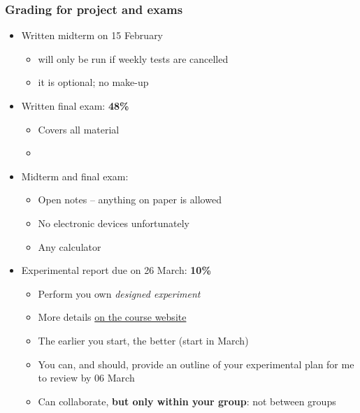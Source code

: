\begin{frame}\frametitle{Grading for project and exams}
	\begin{itemize}
		\item	Written midterm on 15 February
		\begin{itemize}
			\item	will only be run if weekly tests are cancelled
			\item	it is optional; no make-up 
		\end{itemize}
	\end{itemize}
	\begin{itemize}
		\item	Written final exam: \textbf{48\%} 
		\begin{itemize}
			\item	Covers all material 
			\item	\textbf{{\color{myRed}{You must achieve 50\% or greater in final exam to pass 4C3/6C3}}}
		\end{itemize}
	\end{itemize}
	\begin{itemize}
		\item	Midterm and final exam: 
		\begin{itemize}
			\item	Open notes -- anything on paper is allowed 
			\item	No electronic devices unfortunately 
			\item	Any calculator 
		\end{itemize}
	\end{itemize}
	\begin{itemize}
		\item	Experimental report due on 26 March: \textbf{10\%} 
		\begin{itemize}
			\item	Perform you own \emph{designed experiment} 
			\item	More details \href{http://learnche.mcmaster.ca/4C3/Designed_experiments_project_-_2013}{on the course website}
			\item	The earlier you start, the better (start in March)
			\item	You can, and should, provide an outline of your experimental plan for me to review by 06 March 
			\item	Can collaborate, \textbf{but only within your group}: not between groups 
		\end{itemize}
	\end{itemize}
\end{frame}

